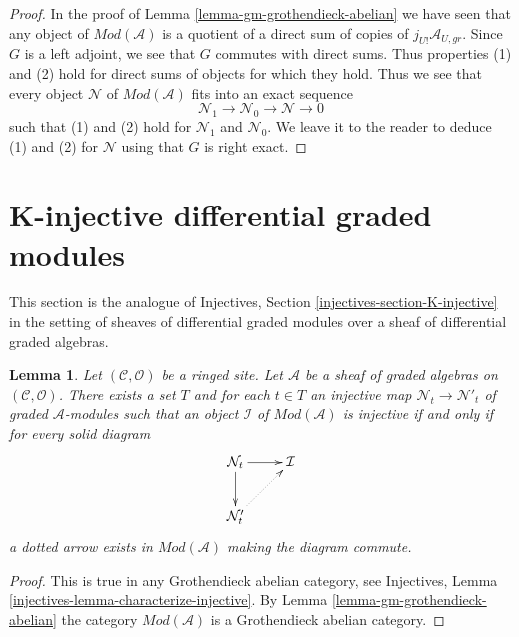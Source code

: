 \documentclass{stacks-project}
\theoremstyle{plain}
\newtheorem{lemma}[subsection]{Lemma}
\theoremstyle{definition}
\theoremstyle{remark}
\numberwithin{equation}{subsection}
\begin{document}
\begin{proof}
\medskip\noindent
In the proof of Lemma \ref{lemma-gm-grothendieck-abelian}
we have seen that any object
of $\textit{Mod}(\mathcal{A})$ is a quotient of a direct sum
of copies of $j_{U!}\mathcal{A}_{U, gr}$. Since $G$ is a left
adjoint, we see that $G$ commutes with direct sums. Thus
properties (1) and (2) hold for direct sums of objects
for which they hold. Thus we see that every object $\mathcal{N}$
of $\textit{Mod}(\mathcal{A})$ fits into an exact sequence
$$
\mathcal{N}_1 \to \mathcal{N}_0 \to \mathcal{N} \to 0
$$
such that (1) and (2) hold for $\mathcal{N}_1$ and $\mathcal{N}_0$.
We leave it to the reader to deduce (1) and (2) for
$\mathcal{N}$ using that $G$ is right exact.
\end{proof}









\section{K-injective differential graded modules}
\label{section-K-injective}

\noindent
This section is the analogue of
Injectives, Section \ref{injectives-section-K-injective}
in the setting of sheaves of differential graded modules
over a sheaf of differential graded algebras.

\begin{lemma}
\label{lemma-characterize-injectives}
Let $(\mathcal{C}, \mathcal{O})$ be a ringed site. Let $\mathcal{A}$
be a sheaf of graded algebras on $(\mathcal{C}, \mathcal{O})$.
There exists a set $T$ and for each $t \in T$ an injective map
$\mathcal{N}_t \to \mathcal{N}'_t$ of graded $\mathcal{A}$-modules
such that an object $\mathcal{I}$ of $\textit{Mod}(\mathcal{A})$
is injective if and only if for every solid diagram
$$
\xymatrix{
\mathcal{N}_t \ar[r] \ar[d] & \mathcal{I} \\
\mathcal{N}'_t \ar@{..>}[ru]
}
$$
a dotted arrow exists in $\textit{Mod}(\mathcal{A})$ making the diagram commute.
\end{lemma}

\begin{proof}
This is true in any Grothendieck abelian category, see
Injectives, Lemma \ref{injectives-lemma-characterize-injective}.
By Lemma \ref{lemma-gm-grothendieck-abelian} the category
$\textit{Mod}(\mathcal{A})$ is a Grothendieck abelian category.
\end{proof}
\end{document}
